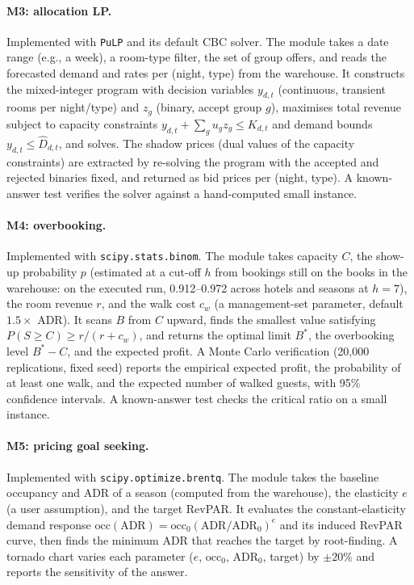 \paragraph{M3: allocation LP.}
Implemented with \texttt{PuLP} and its default CBC solver. The module takes a date range (e.g., a week), a room-type filter, the set of group offers, and reads the forecasted demand and rates per (night, type) from the warehouse. It constructs the mixed-integer program with decision variables $y_{d,t}$ (continuous, transient rooms per night/type) and $z_g$ (binary, accept group $g$), maximises total revenue subject to capacity constraints $y_{d,t} + \sum_g u_g z_g \le K_{d,t}$ and demand bounds $y_{d,t} \le \hat{D}_{d,t}$, and solves. The shadow prices (dual values of the capacity constraints) are extracted by re-solving the program with the accepted and rejected binaries fixed, and returned as bid prices per (night, type). A known-answer test verifies the solver against a hand-computed small instance.

\paragraph{M4: overbooking.}
Implemented with \texttt{scipy.stats.binom}. The module takes capacity $C$, the show-up probability $p$ (estimated at a cut-off $h$ from bookings still on the books in the warehouse: on the executed run, 0.912--0.972 across hotels and seasons at $h = 7$), the room revenue $r$, and the walk cost $c_w$ (a management-set parameter, default $1.5 \times$ ADR). It scans $B$ from $C$ upward, finds the smallest value satisfying $P(S \ge C) \ge r/(r + c_w)$, and returns the optimal limit $B^{*}$, the overbooking level $B^{*} - C$, and the expected profit. A Monte Carlo verification (20{,}000 replications, fixed seed) reports the empirical expected profit, the probability of at least one walk, and the expected number of walked guests, with 95\% confidence intervals. A known-answer test checks the critical ratio on a small instance.

\paragraph{M5: pricing goal seeking.}
Implemented with \texttt{scipy.optimize.brentq}. The module takes the baseline occupancy and ADR of a season (computed from the warehouse), the elasticity $e$ (a user assumption), and the target RevPAR. It evaluates the constant-elasticity demand response $\text{occ}(\text{ADR}) = \text{occ}_0 (\text{ADR}/\text{ADR}_0)^{e}$ and its induced RevPAR curve, then finds the minimum ADR that reaches the target by root-finding. A tornado chart varies each parameter ($e$, $\text{occ}_0$, $\text{ADR}_0$, target) by $\pm 20\%$ and reports the sensitivity of the answer.

